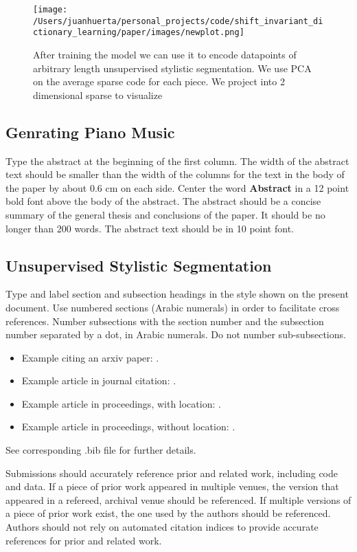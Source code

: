\documentclass[11pt,a4paper]{article}
\begin{document}
\begin{figure*}[ht]
  \texttt{[image: /Users/juanhuerta/personal\_projects/code/shift\_invariant\_dictionary\_learning/paper/images/newplot.png]}
  \caption{After training the model we can use it to encode datapoints of arbitrary length unsupervised stylistic segmentation. We use PCA on the average sparse code for each piece. We project into 2 dimensional sparse to visualize }
  \label{fig:boat1}
\end{figure*}

\subsection{Genrating Piano Music }

Type the abstract at the beginning of the first
column. The width of the abstract text should be smaller than the
width of the columns for the text in the body of the paper by about
0.6 cm on each side. Center the word \textbf{Abstract} in a 12 point bold
font above the body of the abstract. The abstract should be a concise
summary of the general thesis and conclusions of the paper. It should
be no longer than 200 words. The abstract text should be in 10 point font.



\subsection{Unsupervised Stylistic Segmentation }

Type and label section and subsection headings in the
style shown on the present document.  Use numbered sections (Arabic
numerals) in order to facilitate cross references. Number subsections
with the section number and the subsection number separated by a dot,
in Arabic numerals.
Do not number sub-subsections.


\begin{itemize}
\item Example citing an arxiv paper: \cite{rasooli-tetrault-2015}. 
\item Example article in journal citation: \cite{Ando2005}.
\item Example article in proceedings, with location: \cite{borsch2011}.
\item Example article in proceedings, without location: \cite{andrew2007scalable}.
\end{itemize}
See corresponding .bib file for further details.

Submissions should accurately reference prior and related work, including code and data. If a piece of prior work appeared in multiple venues, the version that appeared in a refereed, archival venue should be referenced. If multiple versions of a piece of prior work exist, the one used by the authors should be referenced. Authors should not rely on automated citation indices to provide accurate references for prior and related work.
\end{document}

